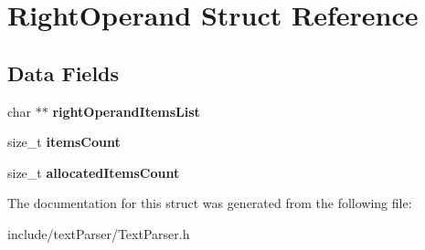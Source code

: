 \hypertarget{struct_right_operand}{}\section{Right\+Operand Struct Reference}
\label{struct_right_operand}
\subsection*{Data Fields}
\begin{DoxyCompactItemize}
\item 
\hypertarget{struct_right_operand_aab9e2a97e1c9ef112e0858f0ca253e9b}{}\label{struct_right_operand_aab9e2a97e1c9ef112e0858f0ca253e9b} 
char $\ast$$\ast$ {\bfseries right\+Operand\+Items\+List}
\item 
\hypertarget{struct_right_operand_a48e4ac11eaaa4c16805d455ffe2c5f5f}{}\label{struct_right_operand_a48e4ac11eaaa4c16805d455ffe2c5f5f} 
size\+\_\+t {\bfseries items\+Count}
\item 
\hypertarget{struct_right_operand_aeec70ba2a764db8a757dbd935e169d4c}{}\label{struct_right_operand_aeec70ba2a764db8a757dbd935e169d4c} 
size\+\_\+t {\bfseries allocated\+Items\+Count}
\end{DoxyCompactItemize}


The documentation for this struct was generated from the following file\+:\begin{DoxyCompactItemize}
\item 
include/text\+Parser/Text\+Parser.\+h\end{DoxyCompactItemize}
